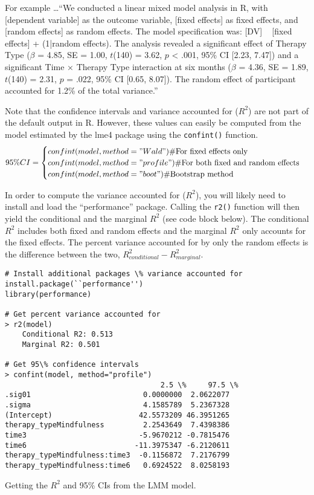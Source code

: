 For example \dots ``We conducted a linear mixed model analysis in R, with [dependent variable] as the outcome variable, [fixed effects] as fixed effects, and [random effects] as random effects. The model specification was: [DV] ~ [fixed effects] + (1|random effects). The analysis revealed a significant effect of Therapy Type ($\beta$ = 4.85, SE = 1.00, $t$(140) = 3.62, $p$ < .001, 95\% CI [2.23, 7.47]) and a significant Time × Therapy Type interaction at six months ($\beta$ = 4.36, SE = 1.89, $t$(140) = 2.31, $p$ = .022, 95\% CI [0.65, 8.07]). The random effect of participant accounted for 1.2\% of the total variance.''

Note that the confidence intervals and variance accounted for ($R^2$) are not part of the default output in R.  However, these values can easily be computed from the model estimated by the lme4 package using the \texttt{confint()} function.
\[95\%CI=\begin{cases}confint(model, method="Wald")  \# \text{For fixed effects only} \\
confint(model, method="profile") \# \text{For both fixed and random effects}\\
confint(model, method="boot") \# \text{Bootstrap method}\end{cases}
\]

In order to compute the variance accounted for ($R^2$), you will likely need to install and load the ``performance'' package.  Calling the \texttt{r2()} function will then yield the conditional and the marginal $R^2$ (see code block below).  The conditional $R^2$ includes both fixed and random effects and the marginal $R^2$ only accounts for the fixed effects.  The percent variance accounted for by only the random effects is the difference between the two, $R_{conditional}^2 - R_{marginal}^2$.
\begin{tcolorbox}[every float=\centering, drop shadow,     title=R Code]
\begin{verbatim}
# Install additional packages \% variance accounted for
install.package(``performance'')
library(performance)

# Get percent variance accounted for
> r2(model)
	Conditional R2: 0.513
	Marginal R2: 0.501

# Get 95\% confidence intervals
> confint(model, method="profile")
                                    2.5 \%     97.5 \%
.sig01                          0.0000000  2.0622077
.sigma                          4.1585789  5.2367328
(Intercept)                    42.5573209 46.3951265
therapy_typeMindfulness         2.2543649  7.4398386
time3                          -5.9670212 -0.7815476
time6                         -11.3975347 -6.2120611
therapy_typeMindfulness:time3  -0.1156872  7.2176799
therapy_typeMindfulness:time6   0.6924522  8.0258193
 \end{verbatim}
\tcblower
\begin{codeblock}{Getting the $R^2$ and 95\% CIs from the LMM model.}\label{code:LMMci}\end{codeblock}
\end{tcolorbox}


